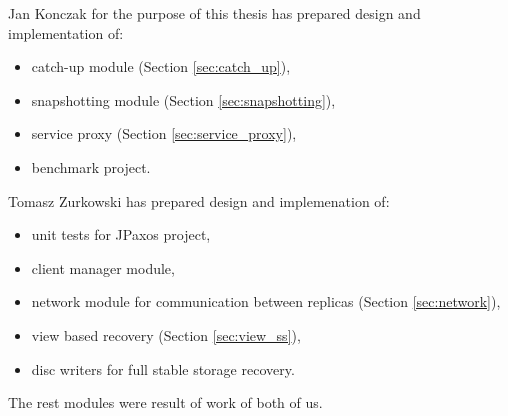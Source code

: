 Jan Konczak for the purpose of this thesis has prepared design and implementation of:
\begin{itemize}
  \item catch-up module (Section \ref{sec:catch_up}),
  \item snapshotting module (Section \ref{sec:snapshotting}),
  \item service proxy (Section \ref{sec:service_proxy}),
  \item benchmark project.
\end{itemize}

Tomasz Zurkowski has prepared design and implemenation of:
\begin{itemize}
  \item unit tests for JPaxos project,
  \item client manager module, 
  \item network module for communication between replicas (Section \ref{sec:network}),
  \item view based recovery (Section \ref{sec:view_ss}),
  \item disc writers for full stable storage recovery.
\end{itemize}

The rest modules were result of work of both of us.
